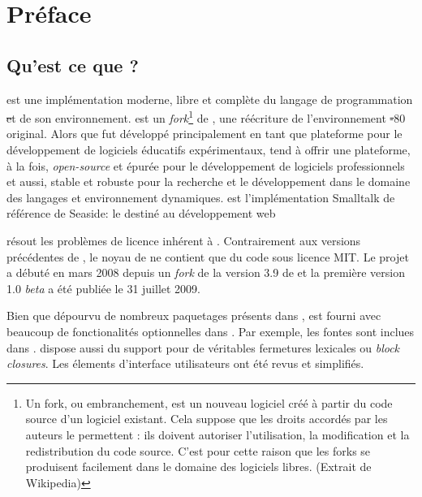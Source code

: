 \documentclass[a4paper,10pt,twoside]{book}
\begin{document}
    \sloppy
    \frontmatter
\fi
\renewcommand{\nnbb}[2]{} %
\sloppy
\chapter{Préface}

\section*{Qu'est ce que \pharo?}

\pharo est une implémentation moderne, libre et complète du
langage de programmation \st et de son environnement. \pharo est
un \emph{fork}\footnote{Un fork, ou embranchement, est un nouveau logiciel créé à partir du code source d'un logiciel existant. Cela suppose que les droits accordés par les auteurs le permettent : ils doivent autoriser l'utilisation, la modification et la redistribution du code source. C'est pour cette raison que les forks se produisent facilement dans le domaine des logiciels libres. (Extrait de Wikipedia)} de \squeak \cite{Inga97a}, 
une réécriture de l'environnement \st-80 original. 
Alors que \squeak fut développé principalement en tant que
plateforme pour le développement de logiciels éducatifs
expérimentaux, \pharo tend à offrir une plateforme,
à la fois, \emph{open-source} et épurée pour le développement de
logiciels professionnels et aussi, stable et robuste pour la recherche 
et le développement dans le domaine des langages et environnement dynamiques. 
\pharo est l'implémentation Smalltalk de référence de Seaside: le \framework 
destiné au développement web%

\pharo résout les problèmes de licence inhérent à \squeak. 
Contrairement aux versions précédentes de \squeak, le noyau
de \pharo ne contient que du code sous licence MIT. Le projet \pharo
a débuté en mars 2008 depuis un \emph{fork} de la version 3.9 de \squeak et la première version 1.0 \emph{beta} a été publiée le
31 juillet 2009. %

Bien que dépourvu de nombreux paquetages présents dans \squeak, \pharo
est fourni avec beaucoup de fonctionalités optionnelles dans \squeak.
Par exemple, les fontes \truetype sont inclues dans \pharo. \pharo
dispose aussi du support pour de véritables fermetures lexicales ou
\emph{block closures}. Les élements d'interface utilisateurs ont été
revus et simplifiés. %
\end{document}
